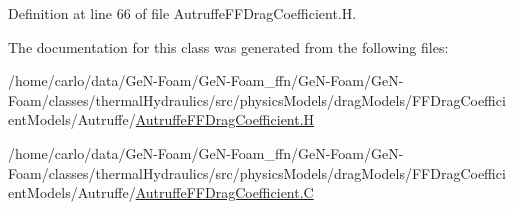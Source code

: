 Definition at line 66 of file Autruffe\+F\+F\+Drag\+Coefficient.\+H.



The documentation for this class was generated from the following files\+:\begin{DoxyCompactItemize}
\item 
/home/carlo/data/\+Ge\+N-\/\+Foam/\+Ge\+N-\/\+Foam\+\_\+ffn/\+Ge\+N-\/\+Foam/\+Ge\+N-\/\+Foam/classes/thermal\+Hydraulics/src/physics\+Models/drag\+Models/\+F\+F\+Drag\+Coefficient\+Models/\+Autruffe/\hyperlink{AutruffeFFDragCoefficient_8H}{Autruffe\+F\+F\+Drag\+Coefficient.\+H}\item 
/home/carlo/data/\+Ge\+N-\/\+Foam/\+Ge\+N-\/\+Foam\+\_\+ffn/\+Ge\+N-\/\+Foam/\+Ge\+N-\/\+Foam/classes/thermal\+Hydraulics/src/physics\+Models/drag\+Models/\+F\+F\+Drag\+Coefficient\+Models/\+Autruffe/\hyperlink{AutruffeFFDragCoefficient_8C}{Autruffe\+F\+F\+Drag\+Coefficient.\+C}\end{DoxyCompactItemize}
